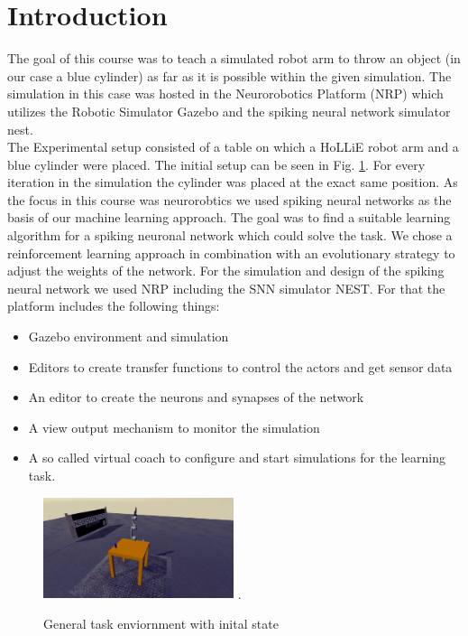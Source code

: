 \section{Introduction}
The goal of this course was to teach a simulated robot arm to throw an object (in our case a blue cylinder) as far as it is possible within the given simulation. The simulation in this case was hosted 
in the Neurorobotics Platform (NRP) which utilizes the Robotic Simulator Gazebo and the spiking neural network simulator nest.\\%
The Experimental setup consisted of a table on which a HoLLiE robot arm and a blue cylinder were placed.
The initial setup can be seen in Fig. \ref{init_state}. For every iteration in the simulation the cylinder was placed at the exact same position. 
As the focus in this course was neurorobtics we used spiking neural networks as the basis of our machine learning approach.  
The goal was to find a suitable learning algorithm for a spiking neuronal network which could solve the task. We chose a reinforcement learning approach in combination with an evolutionary strategy to adjust the weights of the network.
For the simulation and design of the spiking neural network we used NRP including the SNN simulator NEST. For that the platform includes the following things:
 \begin{itemize}
\item Gazebo environment and simulation
\item Editors to create transfer functions to control the actors and get sensor data
\item An editor to create the neurons and synapses of the network
\item A view output mechanism to monitor the simulation
\item A so called virtual coach to configure and start simulations for the learning task.
\end{itemize} 
\begin{figure}[H]
	\centering
	\includegraphics[width=2.2in]{img/init_state.png}
	\DeclareGraphicsExtensions.
	\caption{General task enviornment with inital state }
	\label{init_state}
\end{figure}


